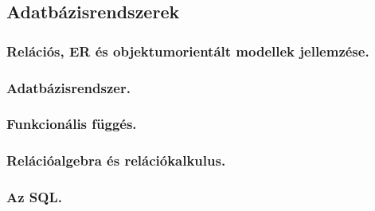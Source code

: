 \subsection{Adatbázisrendszerek}
\subsubsection{Relációs, ER és objektumorientált modellek jellemzése.}

\subsubsection{Adatbázisrendszer.}

\subsubsection{Funkcionális függés.}

\subsubsection{Relációalgebra és relációkalkulus. }

\subsubsection{Az SQL.}
